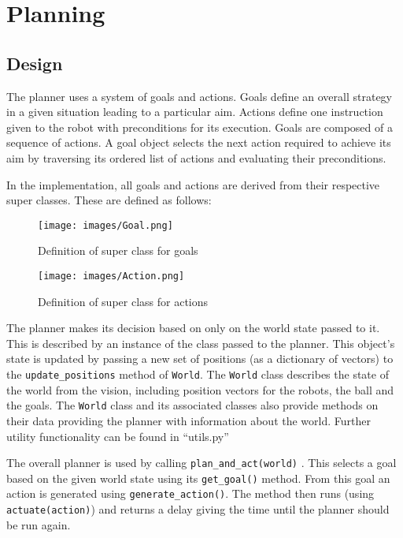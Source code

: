 \section{Planning}
\lstset{language=Python, showstringspaces=false}

\subsection{Design}

The planner uses a system of goals and actions. Goals define an overall strategy in a given situation leading to a particular aim. Actions define one instruction given to the robot with preconditions for its execution. Goals are composed of a sequence of actions. A goal object selects the next action required to achieve its aim by traversing its ordered list of actions and evaluating their preconditions.

In the implementation, all goals and actions are derived from their respective super classes. These are defined as follows:

\begin{figure}[h]
	\begin{center}
          \texttt{[image: images/Goal.png]}
          \caption{Definition of super class for goals}
	\end{center}
\end{figure}


\begin{figure}[h]
	\begin{center}
          \texttt{[image: images/Action.png]}
          \caption{Definition of super class for actions}
	\end{center}
\end{figure}


The planner makes its decision based on only on the world state passed to it. This is described by an instance of the  class passed to the planner. This object's state is updated by passing a new set of positions (as a dictionary of vectors) to the \texttt{update\_positions} method of \texttt{World}. The \texttt{World} class describes the state of the world from the vision, including position vectors for the robots, the ball and the goals. The \texttt{World} class and its associated classes also provide methods on their data providing the planner with information about the world. Further utility functionality can be found in ``utils.py''

The overall planner is used by calling \texttt{plan\_and\_act(world)}
. This selects a goal based on the given world state  using its \texttt{get\_goal()} method. From this goal an action is generated using \texttt{generate\_action()}. The method then runs (using \texttt{actuate(action)}) and returns a delay giving the time until the planner should be run again.

